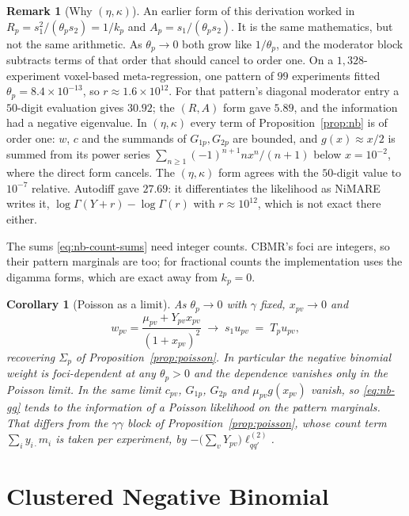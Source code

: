 \documentclass[11pt,a4paper]{article}
\theoremstyle{plain}
\newtheorem{corollary}[proposition]{Corollary}
\theoremstyle{definition}
\newtheorem{remark}[proposition]{Remark}
\begin{document}
\begin{remark}[Why $(\eta, \kappa)$]\label{rem:nb-precision}
An earlier form of this derivation worked in $R_p = s_1^2/(\theta_p s_2) = 1/k_p$ and
$A_p = s_1/(\theta_p s_2)$. It is the same mathematics, but not the same arithmetic. As
$\theta_p \to 0$ both grow like $1/\theta_p$, and the moderator block subtracts terms of that
order that should cancel to order one. On a $1{,}328$-experiment voxel-based meta-regression,
one pattern of $99$ experiments fitted $\theta_p = 8.4\times10^{-13}$, so $r \approx 1.6\times10^{12}$.
For that pattern's diagonal moderator entry a $50$-digit evaluation gives $30.92$; the $(R,A)$
form gave $5.89$, and the information had a negative eigenvalue. In $(\eta,\kappa)$ every term
of Proposition~\ref{prop:nb} is of order one: $w$, $c$ and the summands of $G_{1p}, G_{2p}$
are bounded, and $g(x) \approx x/2$ is summed from its power series
$\sum_{n\ge1} (-1)^{n+1} n x^n/(n+1)$ below $x = 10^{-2}$, where the direct form cancels. The
$(\eta,\kappa)$ form agrees with the $50$-digit value to $10^{-7}$ relative. Autodiff gave
$27.69$: it differentiates the likelihood as NiMARE writes it, $\log\Gamma(Y+r) - \log\Gamma(r)$
with $r \approx 10^{12}$, which is not exact there either.

The sums \eqref{eq:nb-count-sums} need integer counts. CBMR's foci are integers, so their
pattern marginals are too; for fractional counts the implementation uses the digamma forms,
which are exact away from $k_p = 0$.
\end{remark}

\begin{corollary}[Poisson as a limit]
As $\theta_p \to 0$ with $\gamma$ fixed, $x_{pv} \to 0$ and
\[
  w_{pv} = \frac{\mu_{pv} + Y_{pv}x_{pv}}{(1+x_{pv})^2}
   \;\longrightarrow\; s_1 u_{pv} \;=\; T_p u_{pv},
\]
recovering $\Sigma_p$ of Proposition~\ref{prop:poisson}. In particular the negative binomial
weight is foci-dependent at any $\theta_p > 0$ and the dependence vanishes only in the Poisson
limit. In the same limit $c_{pv}$, $G_{1p}$, $G_{2p}$ and $\mu_{pv}g(x_{pv})$ vanish, so
\eqref{eq:nb-gg} tends to the information of a Poisson likelihood on the pattern marginals. That
differs from the $\gamma\gamma$ block of Proposition~\ref{prop:poisson}, whose count term
$\sum_i y_{i\cdot}m_i$ is taken per experiment, by $-\bigl(\sum_v Y_{pv}\bigr)\ell^{(2)}_{qq'}$.
\end{corollary}

\section{Clustered Negative Binomial}
\end{document}
